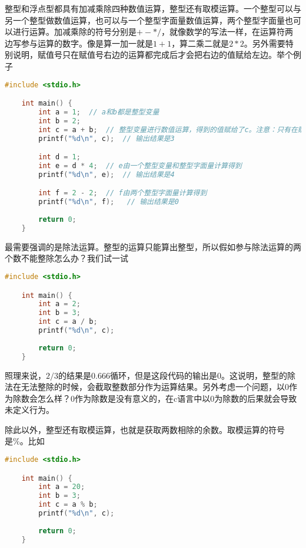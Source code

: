 整型和浮点型都具有加减乘除四种数值运算，整型还有取模运算。一个整型可以与另一个整型做数值运算，也可以与一个整型字面量数值运算，两个整型字面量也可以进行运算。加减乘除的符号分别是$+-*/$，就像数学的写法一样，在运算符两边写参与运算的数字。像是算一加一就是$1+1$，算二乘二就是$2*2$。另外需要特别说明，赋值号只在赋值号右边的运算都完成后才会把右边的值赋给左边。举个例子

\begin{lstlisting}[language=C]
    #include <stdio.h>

    int main() {
        int a = 1;  // a和b都是整型变量
        int b = 2;
        int c = a + b;  // 整型变量进行数值运算，得到的值赋给了c。注意：只有在赋值号右边的运算完成后，赋值号才进行赋值
        printf("%d\n", c);  // 输出结果是3

       	int d = 1;
        int e = d * 4;  // e由一个整型变量和整型字面量计算得到
        printf("%d\n", e);  // 输出结果是4

        int f = 2 - 2;  // f由两个整型字面量计算得到
        printf("%d\n", f);   // 输出结果是0
        
        return 0;
    }
\end{lstlisting}

最需要强调的是除法运算。整型的运算只能算出整型，所以假如参与除法运算的两个数不能整除怎么办？我们试一试

\begin{lstlisting}[language=C]
    #include <stdio.h>

    int main() {
        int a = 2;
        int b = 3;
        int c = a / b;
        printf("%d\n", c);
        
        return 0;
    }
\end{lstlisting}

照理来说，$2/3$的结果是0.666循环，但是这段代码的输出是0。这说明，整型的除法在无法整除的时候，会截取整数部分作为运算结果。另外考虑一个问题，以0作为除数会怎么样？0作为除数是没有意义的，在c语言中以0为除数的后果就会导致未定义行为。

除此以外，整型还有取模运算，也就是获取两数相除的余数。取模运算的符号是\%。比如

\begin{lstlisting}[language=C]
    #include <stdio.h>

    int main() {
        int a = 20;
        int b = 3;
        int c = a % b;
        printf("%d\n", c);
        
        return 0;
    }
\end{lstlisting}


